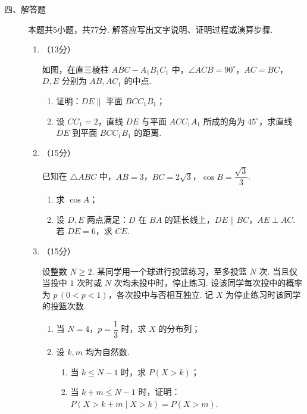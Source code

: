 \begin{description}
    \item[四、解答题] 本题共5小题，共77分. 解答应写出文字说明、证明过程或演算步骤. 
    \begin{enumerate}[leftmargin=5pt]
              \addtocounter{enumi}{+14}   
        \item （13分）

        如图，在直三棱柱 $ABC-A_1B_1C_1$ 中，$\angle ACB=90^\circ$，$AC=BC$，$D,E$ 分别为 $AB,AC_1$ 的中点. 

        \begin{enumerate}[label=(\arabic*)]
            \item 证明：$DE\parallel$ 平面 $BCC_1B_1$；
            \item 设 $CC_1=2$，直线 $DE$ 与平面 $ACC_1A_1$ 所成的角为 $45^\circ$，求直线 $DE$ 到平面 $BCC_1B_1$ 的距离. 
    \end{enumerate}

        \item （15分）

        已知在 $\triangle ABC$ 中，$AB=3$，$BC=2\sqrt{3}$，$\cos B=\dfrac{\sqrt{3}}{3}$. 

        \begin{enumerate}[label=(\arabic*)]
            \item 求 $\cos A$；
            \item 设 $D,E$ 两点满足：$D$ 在 $BA$ 的延长线上，$DE\parallel BC$，$AE\perp AC$. 若 $DE=6$，求 $CE$. 
    \end{enumerate}

        \item （15分）

        设整数 $N\geqslant 2$. 某同学用一个球进行投篮练习，至多投篮 $N$ 次. 当且仅当投中 $1$ 次时或 $N$ 次均未投中时，停止练习. 设该同学每次投中的概率为 $p\,(0<p<1)$，各次投中与否相互独立. 记 $X$ 为停止练习时该同学的投篮次数. 

\begin{enumerate}[label=(\arabic*)]
            \item 当 $N=4$，$p=\dfrac{1}{3}$ 时，求 $X$ 的分布列；
            \item 设 $k,m$ 均为自然数. 
            \begin{enumerate}[label=(\roman*)]
                \item 当 $k\leqslant N-1$ 时，求 $P(X>k)$；
                \item 当 $k+m\leqslant N-1$ 时，证明：$P(X>k+m\mid X>k)=P(X>m)$. 
\end{enumerate}
        \end{enumerate}


\end{enumerate}
\end{description}
